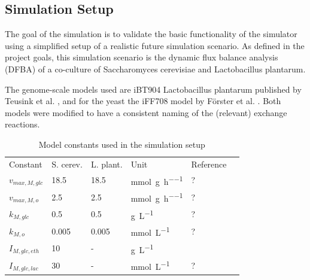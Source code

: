 \subsection{Simulation Setup}\label{ssec:simulation_setup}

The goal of the simulation is to validate the basic functionality of the simulator using a simplified setup of a realistic future
simulation scenario. As defined in the project goals, this simulation scenario is the dynamic flux balance analysis (DFBA) of a
co-culture of Saccharomyces cerevisiae and Lactobacillus plantarum.

The genome-scale models used are iBT904 Lactobacillus plantarum published by Teusink et al. \cite{teusink_analysis_2006},
and for the yeast the iFF708 model by Förster et al. \cite{Foerster01022003}.
Both models were modified to have a consistent naming of the (relevant) exchange reactions.


\begin{table}[h]
\centering
\caption{Model constants used in the simulation setup}
\label{tab:model_constants_simulation_setup}
\begin{tabular}{llllll}
\rowcolor[HTML]{EFEFEF} 
\cellcolor[HTML]{EFEFEF}Constant & \cellcolor[HTML]{EFEFEF}S. cerev. & \cellcolor[HTML]{EFEFEF}L. plant. & Unit & Reference\\
$v_{max,M,glc}$          &  18.5 &  18.5 & \si{\milli\mole\per\gram\per\hour} & ? \\
$v_{max,M,o}$            &   2.5 &   2.5 & \si{\milli\mole\per\gram\per\hour} & ? \\
$k_{M,glc}$              &   0.5 &   0.5 & \si{\gram\per\liter} & ?  \\
$k_{M,o}$                & 0.005 & 0.005 & \si{\milli\mole\per\liter} & ?  \\
$I_{M,glc,eth}$          & 10 & - & \si{\gram\per\liter} & \cite{hjersted_genome-scale_2007} \\
$I_{M,glc,lac}$          & 30 & -  & \si{\milli\mole\per\liter} & ? \\
\end{tabular}
\end{table}

